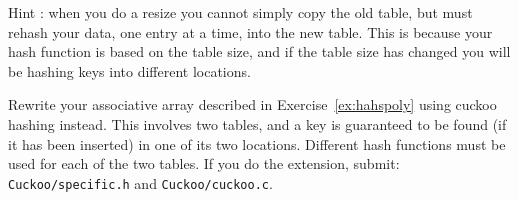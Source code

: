 Hint : when you do a resize you cannot simply
copy the old table, but must rehash your data, one entry at a time,
into the new table.  This is because your hash function is based on the
table size, and if the table size has changed you will be hashing keys
into different locations.


\begin{exercise}
Rewrite your associative array described in Exercise~\ref{ex:hahspoly}
using cuckoo hashing instead.
This involves two tables, and a key is guaranteed to be found (if it
has been inserted) in one of its two locations. Different hash functions
must be used for each of the two tables.
If you do the extension, submit:\\
\verb^Cuckoo/specific.h^ and \verb^Cuckoo/cuckoo.c^.
\end{exercise}
